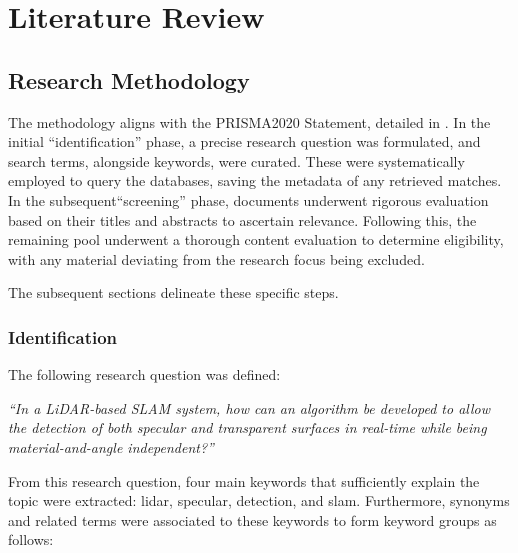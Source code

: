 \chapter{Literature Review}




\section{Research Methodology}

The methodology aligns with the PRISMA2020 Statement, detailed in \citet{prismastatement}. In the initial ``identification'' phase, a precise research question was formulated, and search terms, alongside keywords, were curated. These were systematically employed to query the databases, saving the metadata of any retrieved matches. In the subsequent``screening'' phase, documents underwent rigorous evaluation based on their titles and abstracts to ascertain relevance. Following this, the remaining pool underwent a thorough content evaluation to determine eligibility, with any material deviating from the research focus being excluded.

The subsequent sections delineate these specific steps.

\subsection*{Identification}

The following research question was defined:

\bigskip
\textit{``In a LiDAR-based SLAM system, how can an algorithm be developed to allow the detection of both specular and transparent surfaces in real-time while being material-and-angle independent?''}
\bigskip


From this research question, four main keywords that sufficiently explain the topic were extracted: lidar, specular, detection, and slam. Furthermore, synonyms and related terms were associated to these keywords to form keyword groups as follows:

